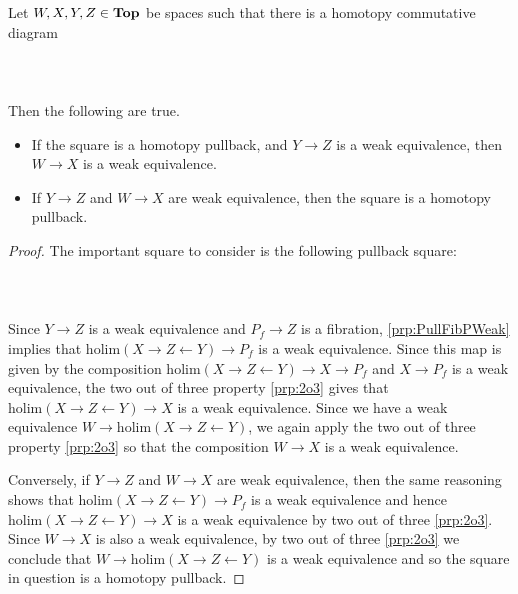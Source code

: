 \begin{prp}\label{prp:HpullSqPWeak} Let $W,X,Y,Z\in\bold{Top}$ be spaces such that there is a homotopy commutative diagram  
 \\~\\  \\~\\
Then the following are true. 
\begin{itemize}
\item If the square is a homotopy pullback, and $Y\to Z$ is a weak equivalence, then $W\to X$ is a weak equivalence. 
\item If $Y\to Z$ and $W\to X$ are weak equivalence, then the square is a homotopy pullback. 
\end{itemize} 
\begin{proof}
The important square to consider is the following pullback square:  
 \\~\\  \\~\\
Since $Y\to Z$ is a weak equivalence and $P_f\to Z$ is a fibration, \ref{prp:PullFibPWeak} implies that $\text{holim}(X\rightarrow Z\leftarrow Y)\to P_f$ is a weak equivalence. Since this map is given by the composition $\text{holim}(X\rightarrow Z\leftarrow Y)\to X\to P_f$ and $X\to P_f$ is a weak equivalence, the two out of three property \ref{prp:2o3} gives that $\text{holim}(X\rightarrow Z\leftarrow Y)\to X$ is a weak equivalence. Since we have a weak equivalence $W\to\text{holim}(X\rightarrow Z\leftarrow Y)$, we again apply the two out of three property \ref{prp:2o3} so that the composition $W\to X$ is a weak equivalence.  

Conversely, if $Y\to Z$ and $W\to X$ are weak equivalence, then the same reasoning shows that $\text{holim}(X\rightarrow Z\leftarrow Y)\to P_f$ is a weak equivalence and hence $\text{holim}(X\rightarrow Z\leftarrow Y)\to X$ is a weak equivalence by two out of three \ref{prp:2o3}. Since $W\to X$ is also a weak equivalence, by two out of three \ref{prp:2o3} we conclude that $W\to\text{holim}(X\rightarrow Z\leftarrow Y)$ is a weak equivalence and so the square in question is a homotopy pullback.
\end{proof}
\end{prp}

